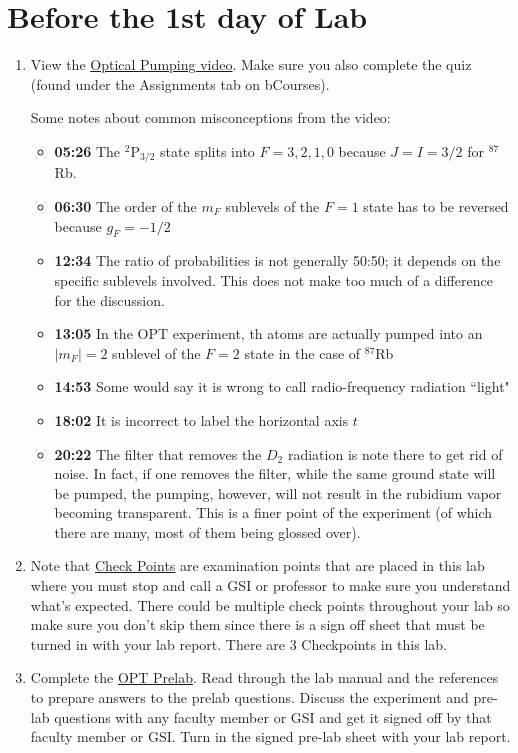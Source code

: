 \documentclass[11pt]{article}
\begin{document}
\section{Before the 1st day of Lab}
\begin{enumerate}
\item View the \href{http://youtu.be/v4StxGAhm8Y}{Optical Pumping video}. Make sure you also complete the quiz (found under the Assignments tab on bCourses).

Some notes about common misconceptions from the video:
\begin{itemize}
\item \textbf{05:26} The $^2$P$_{3/2}$ state splits into $F=3,2,1,0$ because $J=I=3/2$ for $^{87}$Rb.
\item \textbf{06:30} The order of the $m_F$ sublevels of the $F=1$ state has to be reversed because $g_F=-1/2$
\item \textbf{12:34} The ratio of probabilities is not generally 50:50; it depends on the specific sublevels involved. This does not make too much of a difference for the discussion.
\item \textbf{13:05} In the OPT experiment, th atoms are actually pumped into an $|m_F|=2$ sublevel of the $F=2$ state in the case of $^{87}$Rb
\item \textbf{14:53} Some would say it is wrong to call radio-frequency radiation ``light"
\item \textbf{18:02} It is incorrect to label the horizontal axis $t$
\item \textbf{20:22} The filter that removes the $D_2$ radiation is note there to get rid of noise. In fact, if one removes the filter, while the same ground state will be pumped, the pumping, however, will not result in the rubidium vapor becoming transparent. This is a finer point of the experiment (of which there are many, most of them being glossed over).
\end{itemize}

\item Note that \href{http://experimentationlab.berkeley.edu/optprelab}{Check Points} are examination points that are placed in this lab where you must stop and call a GSI or professor to make sure you understand what's expected. There could  be multiple check points throughout your lab so make sure you don't skip them since there is a sign off sheet that must be turned in with your lab report. There are 3 Checkpoints in this lab.

\item Complete the \href{http://experimentationlab.berkeley.edu/optcheckpoints}{OPT Prelab}. Read through the lab manual and the references to prepare answers to the prelab questions. Discuss the experiment and pre-lab questions with any faculty member or GSI and get it signed off by that faculty member or GSI. Turn in the signed pre-lab sheet with your lab report.

\end{enumerate}
\end{document}
